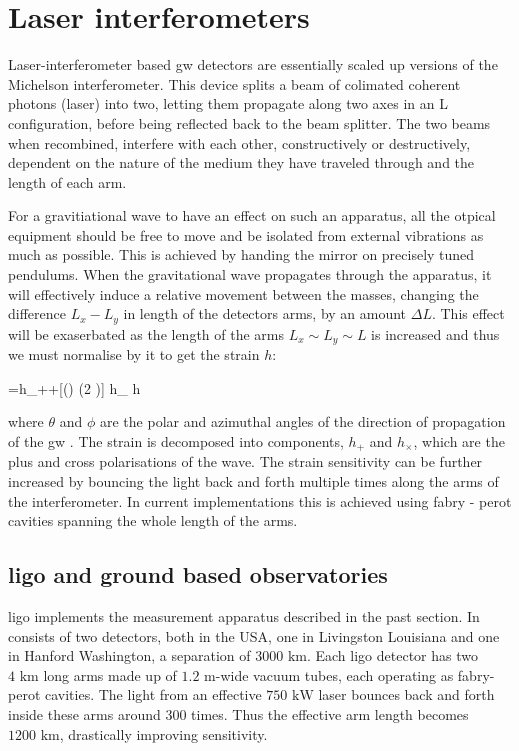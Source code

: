 \documentclass[
  10pt,
  a4paper,
  DIV=11,
  numbers=noendperiod,
  oneside]{scrreprt}
\let\[\relax \let\]\relax %
\DeclareRobustCommand{\[}{\begin{equation}}
\DeclareRobustCommand{\]}{\end{equation}}
\begin{document}
\hypertarget{laser-interferometers}{%
\section{Laser interferometers}\label{laser-interferometers}}

Laser-interferometer based \gls{gw} detectors are essentially scaled up
versions of the Michelson interferometer. This device splits a beam of
colimated coherent photons (laser) into two, letting them propagate
along two axes in an L configuration, before being reflected back to the
beam splitter. The two beams when recombined, interfere with each other,
constructively or destructively, dependent on the nature of the medium
they have traveled through and the length of each arm.

For a gravitiational wave to have an effect on such an apparatus, all
the otpical equipment should be free to move and be isolated from
external vibrations as much as possible. This is achieved by handing the
mirror on precisely tuned pendulums. When the gravitational wave
propagates through the apparatus, it will effectively induce a relative
movement between the masses, changing the difference \(L_x-L_y\) in
length of the detectors arms, by an amount \(\Delta L\). This effect
will be exaserbated as the length of the arms \(L_x \sim L_y \sim L\) is
increased and thus we must normalise by it to get the strain \(h\):

\[
= h_{+}+[\cos (\theta) \sin (2 \phi)] h_{\times} \equiv h
\]

where \(\theta\) and \(\phi\) are the polar and azimuthal angles of the
direction of propagation of the \gls{gw} . The strain is decomposed into
components, \(h_{+}\) and \(h_{\times}\), which are the plus and cross
polarisations of the wave. The strain sensitivity can be further
increased by bouncing the light back and forth multiple times along the
arms of the interferometer. In current implementations this is achieved
using fabry - perot cavities spanning the whole length of the arms.

\hypertarget{sec-ligo}{%
\subsection{\texorpdfstring{\gls{ligo} and ground based
observatories}{ and ground based observatories}}\label{sec-ligo}}

\gls{ligo} implements the measurement apparatus described in the past
section. In consists of two detectors, both in the USA, one in
Livingston Louisiana and one in Hanford Washington, a separation of
\(3000 \text{ km}\). Each \gls{ligo} detector has two \(4\text{ km}\)
long arms made up of \(1.2\text{ m}\)-wide vacuum tubes, each operating
as fabry-perot cavities. The light from an effective \(750\text{ kW}\)
laser bounces back and forth inside these arms around 300 times. Thus
the effective arm length becomes \(1200\text{ km}\), drastically
improving sensitivity.
\end{document}
